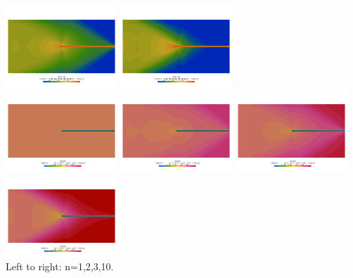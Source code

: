 \begin{center}
\includegraphics[width=4.2cm]{python_codes/fieldstone_87/results/experiment_07/sr_n03}
\includegraphics[width=4.2cm]{python_codes/fieldstone_87/results/experiment_07/sr_n10}\\
\includegraphics[width=4.2cm]{python_codes/fieldstone_87/results/experiment_07/eta_n01}
\includegraphics[width=4.2cm]{python_codes/fieldstone_87/results/experiment_07/eta_n02}
\includegraphics[width=4.2cm]{python_codes/fieldstone_87/results/experiment_07/eta_n03}
\includegraphics[width=4.2cm]{python_codes/fieldstone_87/results/experiment_07/eta_n10}\\
{\captionfont Left to right: n=1,2,3,10.}
\end{center}










